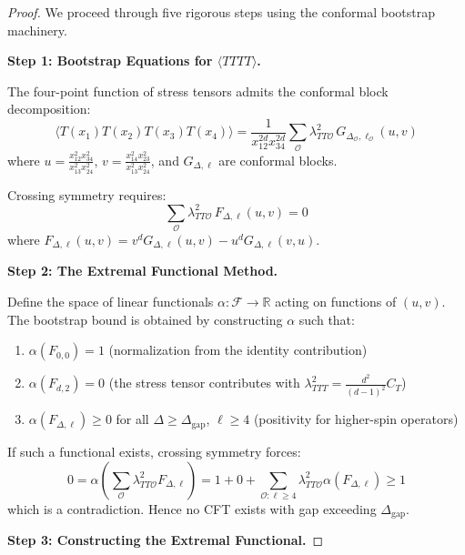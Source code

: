 \documentclass[12pt,a4paper]{article}
\begin{document}
\begin{proof}
We proceed through five rigorous steps using the conformal bootstrap machinery.

\textbf{Step 1: Bootstrap Equations for $\langle TTTT \rangle$.}

The four-point function of stress tensors admits the conformal block decomposition:
\begin{equation}
\langle T(x_1) T(x_2) T(x_3) T(x_4) \rangle = \frac{1}{x_{12}^{2d} x_{34}^{2d}} \sum_{\mathcal{O}} \lambda_{TT\mathcal{O}}^2 \, G_{\Delta_\mathcal{O}, \ell_\mathcal{O}}(u, v)
\end{equation}
where $u = \frac{x_{12}^2 x_{34}^2}{x_{13}^2 x_{24}^2}$, $v = \frac{x_{14}^2 x_{23}^2}{x_{13}^2 x_{24}^2}$, and $G_{\Delta, \ell}$ are conformal blocks.

Crossing symmetry requires:
\begin{equation}
\sum_{\mathcal{O}} \lambda_{TT\mathcal{O}}^2 \, F_{\Delta, \ell}(u, v) = 0
\end{equation}
where $F_{\Delta, \ell}(u, v) = v^d G_{\Delta, \ell}(u, v) - u^d G_{\Delta, \ell}(v, u)$.

\textbf{Step 2: The Extremal Functional Method.}

Define the space of linear functionals $\alpha: \mathcal{F} \to \mathbb{R}$ acting on functions of $(u, v)$. The bootstrap bound is obtained by constructing $\alpha$ such that:
\begin{enumerate}
    \item $\alpha(F_{0,0}) = 1$ (normalization from the identity contribution)
    \item $\alpha(F_{d,2}) = 0$ (the stress tensor contributes with $\lambda_{TTT}^2 = \frac{d^2}{(d-1)^2} C_T$)
    \item $\alpha(F_{\Delta, \ell}) \geq 0$ for all $\Delta \geq \Delta_{\text{gap}}$, $\ell \geq 4$ (positivity for higher-spin operators)
\end{enumerate}

If such a functional exists, crossing symmetry forces:
\begin{equation}
0 = \alpha\left(\sum_{\mathcal{O}} \lambda_{TT\mathcal{O}}^2 F_{\Delta, \ell}\right) = 1 + 0 + \sum_{\mathcal{O}: \ell \geq 4} \lambda_{TT\mathcal{O}}^2 \alpha(F_{\Delta, \ell}) \geq 1
\end{equation}
which is a contradiction. Hence no CFT exists with gap exceeding $\Delta_{\text{gap}}$.

\textbf{Step 3: Constructing the Extremal Functional.}


\end{proof}
\end{document}
